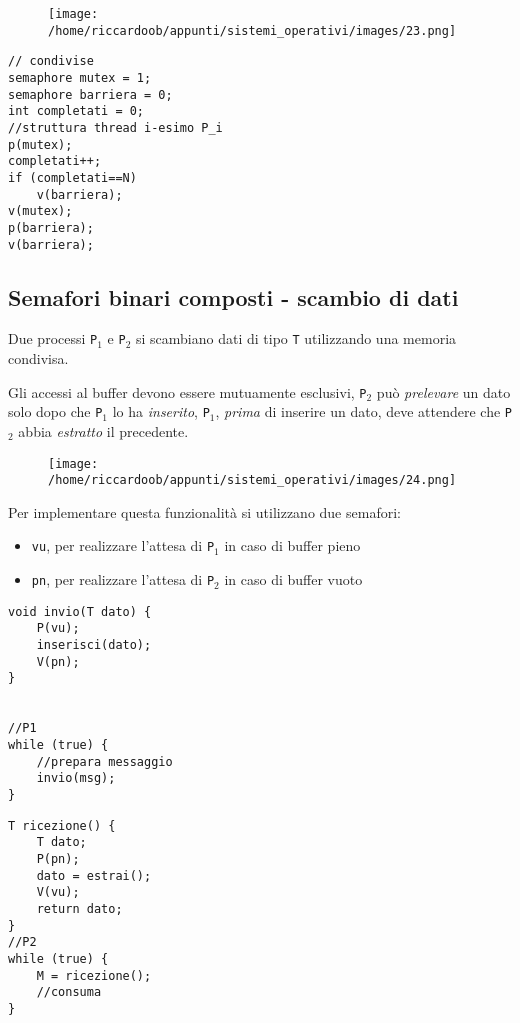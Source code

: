 \begin{figure}[H]
    \centering
    \texttt{[image: /home/riccardoob/appunti/sistemi\_operativi/images/23.png]}
\end{figure}

\begin{verbatim}
// condivise
semaphore mutex = 1;
semaphore barriera = 0;
int completati = 0;
//struttura thread i-esimo P_i
p(mutex);
completati++;
if (completati==N)
    v(barriera);
v(mutex);
p(barriera);
v(barriera);
\end{verbatim}

\subsection{Semafori binari composti - scambio di dati}
Due processi \texttt{P}$_1$ e \texttt{P}$_2$ si scambiano dati di tipo \texttt{T} utilizzando una memoria condivisa.

Gli accessi al buffer devono essere mutuamente esclusivi, \texttt{P}$_2$ può \textit{prelevare} un dato solo dopo che \texttt{P}$_1$ lo ha \textit{inserito}, \texttt{P}$_1$, \textit{prima} di inserire un dato, deve attendere che \texttt{P}$_2$ abbia \textit{estratto} il precedente.

\begin{figure}[H]
    \centering
    \texttt{[image: /home/riccardoob/appunti/sistemi\_operativi/images/24.png]}
\end{figure}

Per implementare questa funzionalità si utilizzano due semafori:
\begin{itemize}
    \item \texttt{vu}, per realizzare l'attesa di \texttt{P}$_1$ in caso di buffer pieno
    \item \texttt{pn}, per realizzare l'attesa di \texttt{P}$_2$ in caso di buffer vuoto
\end{itemize}

\begin{multicols}{2}
    \begin{verbatim}
void invio(T dato) {
    P(vu);
    inserisci(dato);
    V(pn);
}


//P1
while (true) {
    //prepara messaggio
    invio(msg);
}
    \end{verbatim}
    \columnbreak
    \begin{verbatim}
T ricezione() {
    T dato;
    P(pn);
    dato = estrai();
    V(vu);
    return dato;
}
//P2
while (true) {
    M = ricezione();
    //consuma
}
    \end{verbatim}
\end{multicols}

